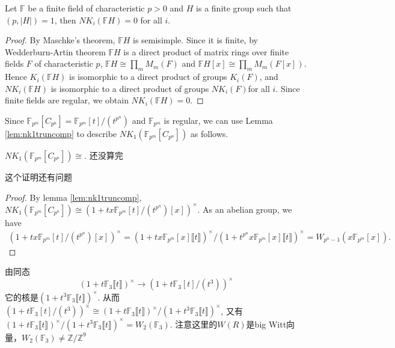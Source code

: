 \begin{theorem}
	Let $\mathbb{F}$ be a finite field of characteristic $p>0$ and $H$ is a finite group such that $(p, |H|)=1$, then $NK_i(\mathbb{F}H)=0$  for all $i$.
\end{theorem}
\begin{proof}
	By Maschke's theorem, $\mathbb{F}H$ is semisimple. Since it is finite, by Wedderburn-Artin theorem $\mathbb{F}H$ is a direct product of matrix rings over finite fields $F$ of characteristic $p$, $\mathbb{F}H \cong \prod_m M_m(F)$ and 
	$\mathbb{F}H[x] \cong \prod_m M_m(F[x])$. Hence $K_i(\mathbb{F}H)$ is isomorphic to a direct product of groups $K_i(F)$, and $NK_i(\mathbb{F}H)$ is isomorphic to a direct product of groups $NK_i(F)$for all $i$. Since finite fields are regular, we obtain $NK_i(\mathbb{F}H)=0$.
\end{proof}




Since $\mathbb{F}_{p^m}[C_{p^n}]=\mathbb{F}_{p^m}[t]/(t^{p^n})$ and $\mathbb{F}_{p^m}$ is regular, we can use Lemma \ref{lem:nk1truncomp} to describe $NK_1(\mathbb{F}_{p^m}[C_{p^n}])$ as follows.
\begin{theorem}
	$NK_1(\mathbb{F}_{p^m}[C_{p^n}])\cong $. 还没算完 %
\end{theorem}
{\color{red} 这个证明还有问题

\begin{proof}
	By lemma \ref{lem:nk1truncomp}, $NK_1(\mathbb{F}_{p^m}[C_{p^n}])\cong  (1+tx\mathbb{F}_{p^m}[t]/(t^{p^n})[x])^{\times}$. As an abelian group, we have
		\begin{align*}
			(1+tx\mathbb{F}_{p^m}[t]/(t^{p^n})[x])^{\times}=  (1+tx\mathbb{F}_{p^m}[x]\llbracket t\rrbracket )^{\times}/(1+t^{p^n}x\mathbb{F}_{p^m}[x]\llbracket t\rrbracket )^{\times} = W_{p^n-1}(x\mathbb{F}_{p^m}[x]).
		\end{align*}

\end{proof}}




由同态
\[(1+t \mathbb{F}_3\llbracket t\rrbracket )^{\times} \longrightarrow (1+t \mathbb{F}_3[t]/(t^3))^{\times}\]
它的核是$(1+t^3 \mathbb{F}_3\llbracket t\rrbracket )^{\times}$.
从而$(1+t \mathbb{F}_3[t]/(t^3))^{\times} \cong (1+t \mathbb{F}_3\llbracket t\rrbracket )^{\times}/(1+t^3 \mathbb{F}_3\llbracket t\rrbracket )^{\times}$, 又有$(1+t \mathbb{F}_3\llbracket t\rrbracket )^{\times}/(1+t^3 \mathbb{F}_3\llbracket t\rrbracket )^{\times}= W_2(\mathbb{F}_3)$. 注意这里的$W(R)$是big Witt向量，$W_2(\mathbb{F}_3) \neq \mathbb{Z}/\mathbb{Z}^9$


